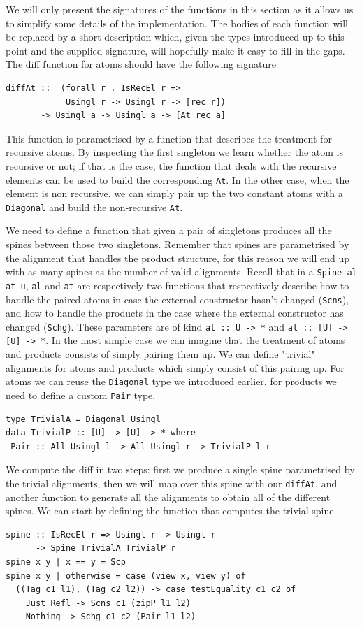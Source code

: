 \documentclass[11pt, titlepage]{article}
\newcommand{\toHaskell}[1]{\texttt{#1}\xspace}
\newcommand{\scns}{\toHaskell{Scns}}
\newcommand{\schg}{\toHaskell{Schg}}
\begin{document}
We will only present the signatures of the functions in this section as it allows us to simplify some details of the implementation. The bodies of each function will be replaced by a short description which, given the types introduced up to this point and the supplied signature, will hopefully make it easy to fill in the gaps. 
The diff function for atoms should have the following signature
\begin{verbatim}
diffAt ::  (forall r . IsRecEl r => 
            Usingl r -> Usingl r -> [rec r])
       -> Usingl a -> Usingl a -> [At rec a]
\end{verbatim}
This function is parametrised by a function that describes the treatment for 
recursive atoms. By inspecting the first singleton we learn whether the atom is 
recursive or not; if that is the case, the function that deals with the 
recursive elements can be used to build the corresponding \texttt{At}. In the 
other case, when the element is non recursive, we can simply pair up the two 
constant atoms with a \texttt{Diagonal} and build the non-recursive \texttt{At}.

We need to define a function that given a pair of singletons produces all the spines between those two singletons. Remember that spines are parametrised by the alignment that handles the product structure, for this reason we will end up with as many spines as the number of valid alignments.
Recall that in a \toHaskell{Spine al at u}, \toHaskell{al} and \toHaskell{at} are respectively two functions that respectively describe how to handle the paired atoms in case the external constructor hasn't changed (\scns), and how to handle the products in the case where the external constructor has changed (\schg). These parameters are of kind \toHaskell{at :: U -> *} and \toHaskell{al :: [U] -> [U] -> *}. In the most simple case we can imagine that the treatment of atoms and products consists of simply pairing them up. We can define "trivial" alignments for atoms and products which simply consist of this pairing up. For atoms we can reuse the \toHaskell{Diagonal} type we introduced earlier, for products we need to define a custom \toHaskell{Pair} type.

\begin{verbatim}
type TrivialA = Diagonal Usingl
data TrivialP :: [U] -> [U] -> * where
 Pair :: All Usingl l -> All Usingl r -> TrivialP l r
\end{verbatim}

We compute the diff in two steps: first we produce a single spine parametrised by the trivial alignments, then we will map over this spine with our \toHaskell{diffAt}, and another function to generate all the alignments to obtain all of the different spines.
We can start by defining the function that computes the trivial spine.
\begin{verbatim}
spine :: IsRecEl r => Usingl r -> Usingl r 
      -> Spine TrivialA TrivialP r
spine x y | x == y = Scp
spine x y | otherwise = case (view x, view y) of
  ((Tag c1 l1), (Tag c2 l2)) -> case testEquality c1 c2 of
    Just Refl -> Scns c1 (zipP l1 l2)
    Nothing -> Schg c1 c2 (Pair l1 l2)
\end{verbatim}
\end{document}
